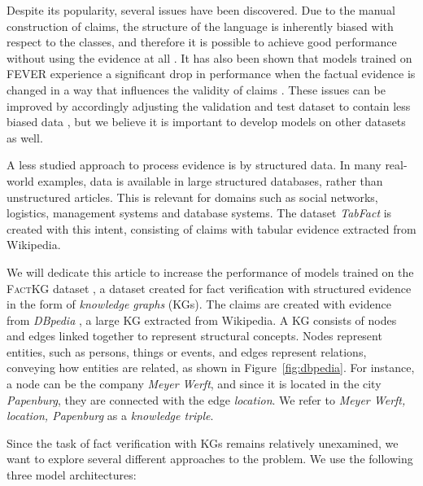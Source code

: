 \documentclass[11pt]{article}
\begin{document}
Despite its popularity, several issues have been discovered. Due to the manual construction of claims, the structure of the language is inherently biased with respect to the classes, and therefore it is possible to achieve good performance without using the evidence at all \citep{schuster2019towards_debiasing}. It has also been shown that models trained on FEVER experience a significant drop in performance when the factual evidence is changed in a way that influences the validity of claims \citep{hidey2020deseption}. These issues can be improved by accordingly adjusting the validation and test dataset to contain less biased data \citep{schuster2019towards_debiasing, hidey2020deseption}, but we believe it is important to develop models on other datasets as well.

A less studied approach to process evidence is by structured data. In many real-world examples, data is available in large structured databases, rather than unstructured articles. This is relevant for domains such as social networks, logistics, management systems and database systems. The dataset \emph{TabFact} \citep{chen2019tabfact} is created with this intent, consisting of claims with tabular evidence extracted from Wikipedia. 



We will dedicate this article to increase the performance of models trained on the \textsc{FactKG} dataset \citep{kim2023factkg}, a dataset created for fact verification with structured evidence in the form of \emph{knowledge graphs} (KGs). The claims are created with evidence from \emph{DBpedia} \citep{lehmann2015dbpedia}, a large KG extracted from Wikipedia. A KG consists of nodes and edges linked together to represent structural concepts. Nodes represent entities, such as persons, things or events, and edges represent relations, conveying how entities are related, as shown in Figure~\ref{fig:dbpedia}. For instance, a node can be the company \emph{Meyer Werft}, and since it is located in the city \emph{Papenburg}, they are connected with the edge \emph{location}. We refer to \textit{Meyer Werft, location, Papenburg} as a \emph{knowledge triple}.

Since the task of fact verification with KGs remains relatively unexamined, we want to explore several different approaches to the problem. We use the following three model architectures:
\end{document}
